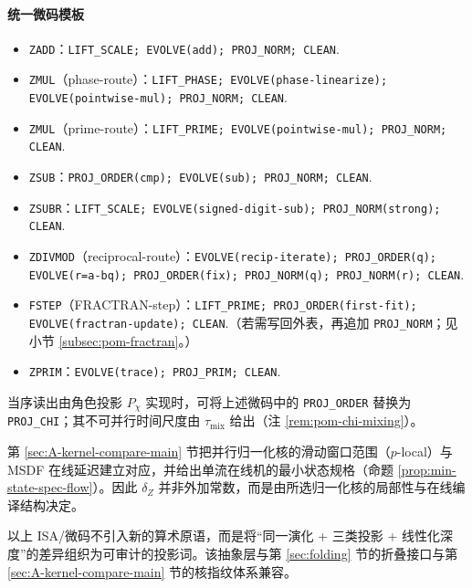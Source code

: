 \paragraph{统一微码模板}
\begin{itemize}
  \item \texttt{ZADD}：\texttt{LIFT\_SCALE; EVOLVE(add); PROJ\_NORM; CLEAN}.
  \item \texttt{ZMUL}（phase-route）：\texttt{LIFT\_PHASE; EVOLVE(phase-linearize); EVOLVE(pointwise-mul); PROJ\_NORM; CLEAN}.
  \item \texttt{ZMUL}（prime-route）：\texttt{LIFT\_PRIME; EVOLVE(pointwise-mul); PROJ\_NORM; CLEAN}.
  \item \texttt{ZSUB}：\texttt{PROJ\_ORDER(cmp); EVOLVE(sub); PROJ\_NORM; CLEAN}.
  \item \texttt{ZSUBR}：\texttt{LIFT\_SCALE; EVOLVE(signed-digit-sub); PROJ\_NORM(strong); CLEAN}.
  \item \texttt{ZDIVMOD}（reciprocal-route）：\texttt{EVOLVE(recip-iterate); PROJ\_ORDER(q); EVOLVE(r=a-bq); PROJ\_ORDER(fix); PROJ\_NORM(q); PROJ\_NORM(r); CLEAN}.
  \item \texttt{FSTEP}（FRACTRAN-step）：\texttt{LIFT\_PRIME; PROJ\_ORDER(first-fit); EVOLVE(fractran-update); CLEAN}.（若需写回外表，再追加 \texttt{PROJ\_NORM}；见小节 \ref{subsec:pom-fractran}。）
  \item \texttt{ZPRIM}：\texttt{EVOLVE(trace); PROJ\_PRIM; CLEAN}.
\end{itemize}

\begin{remark}
当序读出由角色投影 $P_\chi$ 实现时，可将上述微码中的 \texttt{PROJ\_ORDER} 替换为 \texttt{PROJ\_CHI}；其不可并行时间尺度由 $\tau_{\mathrm{mix}}$ 给出（注 \ref{rem:pom-chi-mixing}）。
\end{remark}

\begin{remark}\label{rem:pom-plocal-delay}
第 \ref{sec:A-kernel-compare-main} 节把并行归一化核的滑动窗口范围（$p$-local）与 MSDF 在线延迟建立对应，并给出单流在线机的最小状态规格（命题 \ref{prop:min-state-spec-flow}）。因此 $\delta_Z$ 并非外加常数，而是由所选归一化核的局部性与在线编译结构决定。
\end{remark}

以上 ISA/微码不引入新的算术原语，而是将“同一演化 + 三类投影 + 线性化深度”的差异组织为可审计的投影词。该抽象层与第 \ref{sec:folding} 节的折叠接口与第 \ref{sec:A-kernel-compare-main} 节的核指纹体系兼容。

